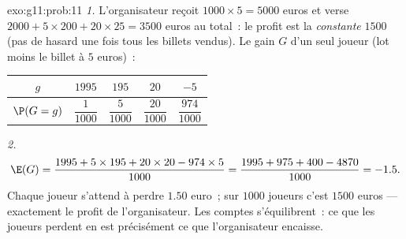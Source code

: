 \begin{solution}{exo:g11:prob:11}
\emph{1.} L'organisateur reçoit $1000 \times 5 = 5000$ euros et verse
$2000 + 5 \times 200 + 20 \times 25 = 3500$ euros au total~: le profit
est la \emph{constante} $1500$ (pas de hasard une fois tous les billets
vendus). Le gain $G$ d'un seul joueur (lot moins le billet à $5$ euros)~:
\begin{center}
\begin{tabular}{c|cccc}
$g$ & $1995$ & $195$ & $20$ & $-5$\\
\hline\rule{0pt}{11pt}%
$\P(G=g)$ & $\dfrac{1}{1000}$ & $\dfrac{5}{1000}$ & $\dfrac{20}{1000}$
& $\dfrac{974}{1000}$
\end{tabular}
\end{center}

\emph{2.}
\[
\E(G) = \frac{1995 + 5 \times 195 + 20 \times 20 - 974 \times 5}{1000}
= \frac{1995 + 975 + 400 - 4870}{1000} = -1.5 .
\]
Chaque joueur s'attend à perdre $1.50$ euro~; sur $1000$ joueurs c'est
$1500$ euros --- exactement le profit de l'organisateur. Les comptes
s'équilibrent~: ce que les joueurs perdent en  est précisément ce
que l'organisateur encaisse.
\end{solution}

